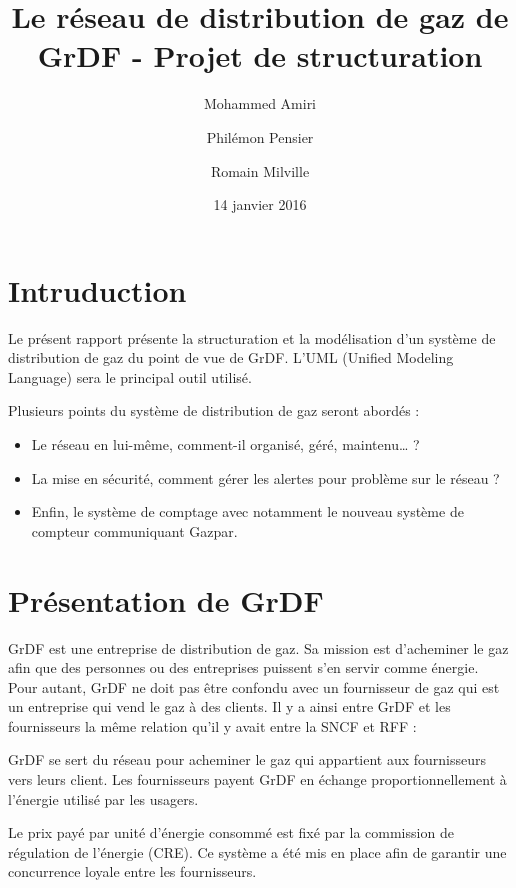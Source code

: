 \documentclass[
12pt,
french,                           %
a4paper,
]{article}
\title{ Le réseau de distribution de gaz de GrDF - Projet de structuration }
\author{ Mohammed Amiri\and Philémon Pensier \and Romain Milville}
\date{14 janvier 2016}
\begin{document}

\clearpage



{
  \hypersetup{linkcolor=black}
  \setcounter{tocdepth}{3}
  \tableofcontents
}


\clearpage
\section{Intruduction}

Le présent rapport présente la structuration et la modélisation d'un
système de distribution de gaz du point de vue de GrDF. L'UML (Unified
Modeling Language) sera le principal outil utilisé.

Plusieurs points du système de distribution de gaz seront abordés :

\begin{itemize}
\item
  Le réseau en lui-même, comment-il organisé, géré, maintenu\ldots{} ?
\item
  La mise en sécurité, comment gérer les alertes pour problème sur le
  réseau ?
\item
  Enfin, le système de comptage avec notamment le nouveau système de
  compteur communiquant Gazpar.
\end{itemize}

\section{Présentation de GrDF}

GrDF est une entreprise de distribution de gaz. Sa mission est
d'acheminer le gaz afin que des personnes ou des entreprises puissent
s'en servir comme énergie. Pour autant, GrDF ne doit pas être confondu
avec un fournisseur de gaz qui est un entreprise qui vend le gaz à des
clients. Il y a ainsi entre GrDF et les fournisseurs la même relation
qu'il y avait entre la SNCF et RFF :

GrDF se sert du réseau pour acheminer le gaz qui appartient aux
fournisseurs vers leurs client. Les fournisseurs payent GrDF en échange
proportionnellement à l'énergie utilisé par les usagers.

Le prix payé par unité d'énergie consommé est fixé par la commission de
régulation de l'énergie (CRE). Ce système a été mis en place afin de
garantir une concurrence loyale entre les fournisseurs.
\end{document}
